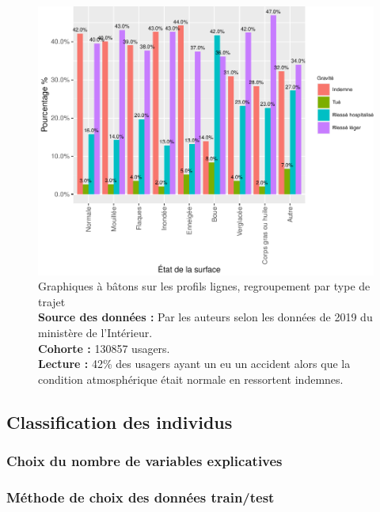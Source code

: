 \documentclass[french,]{tp}
\begin{document}
\begin{figure}[ht!]

{\centering \includegraphics{Prediction_Gravite_files/figure-latex/barplotsurface-1} 

}

\caption{Graphiques à bâtons sur les profils lignes, regroupement par type de trajet\\
\textbf{Source des données :} Par les auteurs selon les données de 2019 du ministère de l'Intérieur.\\
\textbf{Cohorte :} 130857 usagers.\\
\textbf{Lecture :} 42\% des usagers ayant un eu un accident alors que la condition atmosphérique était normale en ressortent indemnes.}\label{fig:barplotsurface}
\end{figure}

\hypertarget{classification-des-individus}{%
\subsection{Classification des individus}\label{classification-des-individus}}

\hypertarget{choix-du-nombre-de-variables-explicatives}{%
\subsubsection{Choix du nombre de variables explicatives}\label{choix-du-nombre-de-variables-explicatives}}

\hypertarget{muxe9thode-de-choix-des-donnuxe9es-traintest}{%
\subsubsection{Méthode de choix des données train/test}\label{muxe9thode-de-choix-des-donnuxe9es-traintest}}
\end{document}
